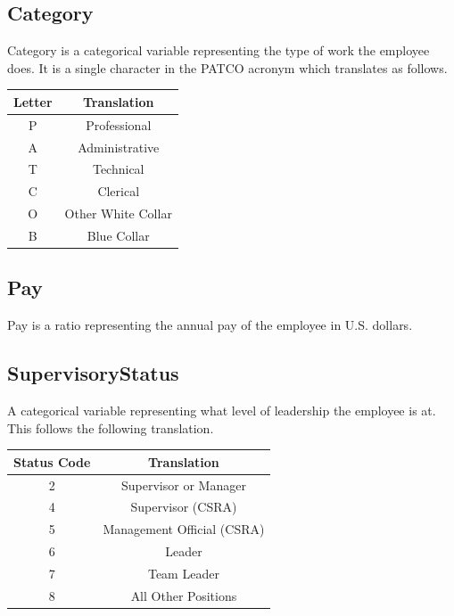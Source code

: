 \documentclass{article}
\begin{document}
    \subsection{Category}
    Category is a categorical variable representing the type of work the employee does. It is a single character in the PATCO acronym which translates as follows.

        \begin{center}
            \begin{tabular}{ |c|c| }
                \hline
                Letter & Translation \\
                \hline
                P & Professional \\
                A & Administrative \\
                T & Technical \\
                C & Clerical \\
                O & Other White Collar \\
                B & Blue Collar \\
                \hline
            \end{tabular}
        \end{center}

    \subsection{Pay}
    Pay is a ratio representing the annual pay of the employee in U.S. dollars.

    \subsection{SupervisoryStatus}
    A categorical variable representing what level of leadership the employee is at. This follows the following translation.

        \begin{center}
            \begin{tabular}{ |c|c| }
                \hline
                Status Code & Translation \\
                \hline
                2 & Supervisor or Manager \\
                4 & Supervisor (CSRA) \\
                5 & Management Official (CSRA) \\
                6 & Leader \\
                7 & Team Leader \\
                8 & All Other Positions \\
                \hline
            \end{tabular}
        \end{center}
\end{document}
